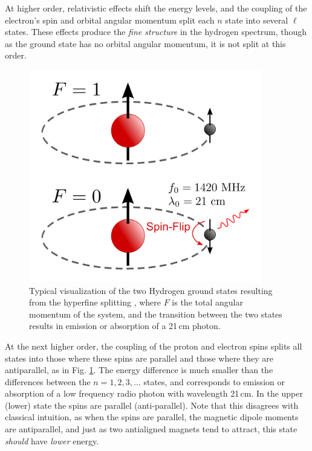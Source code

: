 {At higher order, relativistic effects shift the energy levels, and the coupling of the electron's spin and orbital angular momentum split each $n$ state into several $\ell$ states. These effects produce the \textit{fine structure} in the hydrogen spectrum, though as the ground state has no orbital angular momentum, it is not split at this order. 

\begin{figure}
	\centering
	\includegraphics[width=4in]{chap0_intro/500px-Hydrogen-SpinFlip.png}
	\caption[Diagram of the two Hydrogen ground states resulting from hyperfine splitting.]{Typical visualization of the two Hydrogen ground states resulting from the hyperfine splitting \citep{HydrogenSpinFlipGraphic}, where $F$ is the total angular momentum of the system, and the transition between the two states results in emission or absorption of a 21\,cm photon.}
	\label{fig:HydrogenSpinFlipGraphic}
\end{figure}

At the next higher order, the coupling of the proton and electron spins splits all states into those where these spins are parallel and those where they are antiparallel, as in Fig. \ref{fig:HydrogenSpinFlipGraphic}. The energy difference is much smaller than the differences between the $n=1,2,3,...$ states, and corresponds to emission or absorption of a low frequency radio photon with wavelength 21\,cm. In the upper (lower) state the spins are parallel (anti-parallel). Note that this disagrees with classical intuition, as when the spins are parallel, the magnetic dipole moments are antiparallel, and just as two antialigned magnets tend to attract, this state \textit{should} have \textit{lower} energy. 

}
